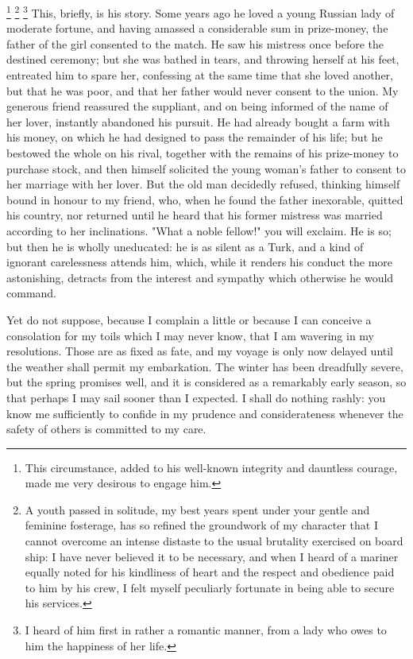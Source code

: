 \footnote{This circumstance, added to his well-known integrity and dauntless courage, made me very desirous to engage him.}
\footnote{A youth passed in solitude, my best years spent under your gentle and feminine fosterage, has so refined the groundwork of my character that I cannot overcome an intense distaste to the usual brutality exercised on board ship: I have never believed it to be necessary, and when I heard of a mariner equally noted for his kindliness of heart and the respect and obedience paid to him by his crew, I felt myself peculiarly fortunate in being able to secure his services.}
\footnote{I heard of him first in rather a romantic manner, from a lady who owes to him the happiness of her life.}
This, briefly, is his story. Some years ago he loved a young Russian lady of moderate fortune, and having amassed a considerable sum in prize-money, the father of the girl consented to the match. He saw his mistress once before the destined ceremony; but she was bathed in tears, and throwing herself at his feet, entreated him to spare her, confessing at the same time that she loved another, but that he was poor, and that her father would never consent to the union. My generous friend reassured the suppliant, and on being informed of the name of her lover, instantly abandoned his pursuit. He had already bought a farm with his money, on which he had designed to pass the remainder of his life; but he bestowed the whole on his rival, together with the remains of his prize-money to purchase stock, and then himself solicited the young woman's father to consent to her marriage with her lover. But the old man decidedly refused, thinking himself bound in honour to my friend, who, when he found the father inexorable, quitted his country, nor returned until he heard that his former mistress was married according to her inclinations. "What a noble fellow!" you will exclaim. He is so; but then he is wholly uneducated: he is as silent as a Turk, and a kind of ignorant carelessness attends him, which, while it renders his conduct the more astonishing, detracts from the interest and sympathy which otherwise he would command.

Yet do not suppose, because I complain a little or because I can conceive a consolation for my toils which I may never know, that I am wavering in my resolutions. Those are as fixed as fate, and my voyage is only now delayed until the weather shall permit my embarkation. The winter has been dreadfully severe, but the spring promises well, and it is considered as a remarkably early season, so that perhaps I may sail sooner than I expected. I shall do nothing rashly: you know me sufficiently to confide in my prudence and considerateness whenever the safety of others is committed to my care.

